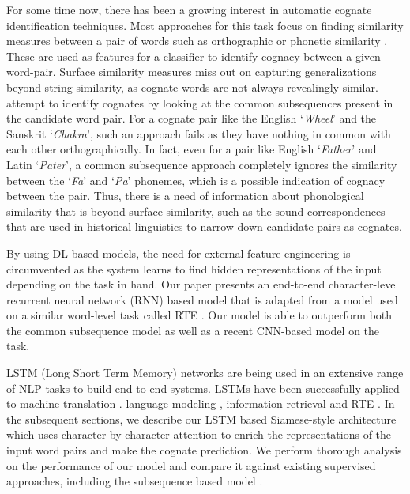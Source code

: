 \documentclass[11pt,letterpaper]{article}
\begin{document}
For some time now, there has been a growing interest in automatic cognate identification techniques. Most approaches for this task focus on finding similarity measures between a pair of words such as orthographic or phonetic similarity \cite{hauer2011clustering} \cite{inkpen2005similarity} \cite{List2016g}. These are used as features for a classifier to identify cognacy between a given word-pair. Surface similarity measures miss out on capturing generalizations beyond string similarity, as cognate words are not always revealingly similar. \cite{rama2015automatic} attempt to identify cognates by looking at the common subsequences present in the candidate word pair. For a cognate pair like the English `\textit{Wheel}' and the Sanskrit `\textit{Chakra}', such an approach fails as they have nothing in common with each other orthographically. In fact, even for a pair like English `\textit{Father}' and Latin `\textit{Pater}', a common subsequence approach completely ignores the similarity between the `\textit{Fa}' and `\textit{Pa}' phonemes, which is a possible indication of cognacy between the pair. Thus, there is a need of information about phonological similarity that is beyond surface similarity, such as the sound correspondences that are used in historical linguistics to narrow down candidate pairs as cognates.

By using DL based models, the need for external feature engineering is circumvented as the system learns to find hidden representations of the input depending on the task in hand. Our paper presents an end-to-end character-level recurrent neural network (RNN) based model that is adapted from a model used on a similar word-level task called RTE \cite{rocktaschel2016reasoning}. Our model is able to outperform both the common subsequence model \cite{rama2015automatic} as well as a recent CNN-based model \cite{rama2016siamese} on the task. 

LSTM (Long Short Term Memory) networks are being used in an extensive range of NLP tasks to build end-to-end systems. LSTMs have been successfully applied to machine translation \cite{bahdanau2014neural}. language modeling \cite{mikolov2010recurrent}, information retrieval \cite{sordoni2015hierarchical} and RTE \cite{snli:emnlp2015}. In the subsequent sections, we describe our LSTM based Siamese-style architecture which uses character by character attention to enrich the representations of the input word pairs and make the cognate prediction. We perform thorough analysis on the performance of our model and compare it against existing supervised approaches, including the subsequence based model \cite{rama2015automatic}.
\end{document}
